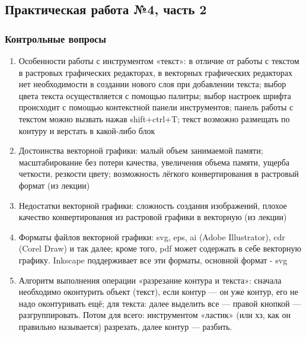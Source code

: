 \documentclass{article}
\begin{document}
\subsection{Практическая работа №4, часть 2}

\subsubsection{Контрольные вопросы}

\begin{enumerate}
    \item Особенности работы с инструментом «текст»: в отличие от работы с текстом в растровых графических редакторах, в векторных графических редакторах нет необходимости в создании нового слоя при добавлении текста; выбор цвета текста осуществляется с помощью палитры; выбор настроек шрифта происходит с помощью контекстной панели инструментов; панель работы с текстом можно вызвать нажав shift+ctrl+T; текст возможно размещать по контуру и верстать в какой-либо блок
    \item Достоинства векторной графики: малый объем занимаемой памяти; масштабирование без потери качества, увеличения объема памяти, ущерба четкости, резкости цвету; возможность лёгкого конвертирования в растровый формат (из лекции)
    \item Недостатки векторной графики: сложность создания изображений, плохое качество конвертирования из растровой графики в векторную (из лекции)
    \item Форматы файлов векторной графики: svg, eps, ai (Adobe Illustrator), cdr (Corel Draw) и так далее; кроме того, pdf может содержать в себе векторную графику. Inkscape поддерживает все эти форматы, основной формат - svg
    \item Алгоритм выполнения операции «разрезание контура и текста»: сначала необходимо оконтурить объект (текст), если контур — он уже контур, его не надо оконтуривать ещё; для текста: далее выделить все — правой кнопкой — разгруппировать. Потом для всего: инструментом «ластик» (или хз, как он правильно называется) разрезать, далее контур — разбить.
\end{enumerate}
\end{document}
